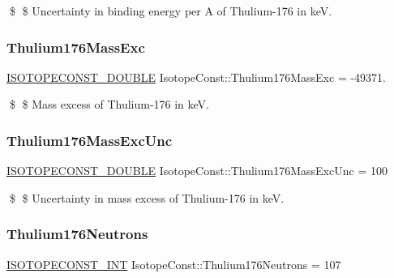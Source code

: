 \$ \$ Uncertainty in binding energy per A of Thulium-\/176 in keV. \mbox{\label{group___isotope_const-_thulium-_tm176_ga06bffe2f883993703e49dcc008575cb9}} 
\subsubsection{\texorpdfstring{Thulium176\+Mass\+Exc}{Thulium176MassExc}}
{\footnotesize\ttfamily \mbox{\hyperlink{group___isotope_const-_macros_ga8f45a7272ce02c0b4c65c44636ed719a}{I\+S\+O\+T\+O\+P\+E\+C\+O\+N\+S\+T\+\_\+\+D\+O\+U\+B\+LE}} Isotope\+Const\+::\+Thulium176\+Mass\+Exc = -\/49371.}

\$ \$ Mass excess of Thulium-\/176 in keV. \mbox{\label{group___isotope_const-_thulium-_tm176_ga8392559cbf3ae92c4075d7c6a1362d3d}} 
\subsubsection{\texorpdfstring{Thulium176\+Mass\+Exc\+Unc}{Thulium176MassExcUnc}}
{\footnotesize\ttfamily \mbox{\hyperlink{group___isotope_const-_macros_ga8f45a7272ce02c0b4c65c44636ed719a}{I\+S\+O\+T\+O\+P\+E\+C\+O\+N\+S\+T\+\_\+\+D\+O\+U\+B\+LE}} Isotope\+Const\+::\+Thulium176\+Mass\+Exc\+Unc = 100}

\$ \$ Uncertainty in mass excess of Thulium-\/176 in keV. \mbox{\label{group___isotope_const-_thulium-_tm176_ga376e8fe714611eaf5e4bf0782cde3e6e}} 
\subsubsection{\texorpdfstring{Thulium176\+Neutrons}{Thulium176Neutrons}}
{\footnotesize\ttfamily \mbox{\hyperlink{group___isotope_const-_macros_ga5f18360b3e99483a35c32d789e62621c}{I\+S\+O\+T\+O\+P\+E\+C\+O\+N\+S\+T\+\_\+\+I\+NT}} Isotope\+Const\+::\+Thulium176\+Neutrons = 107}

